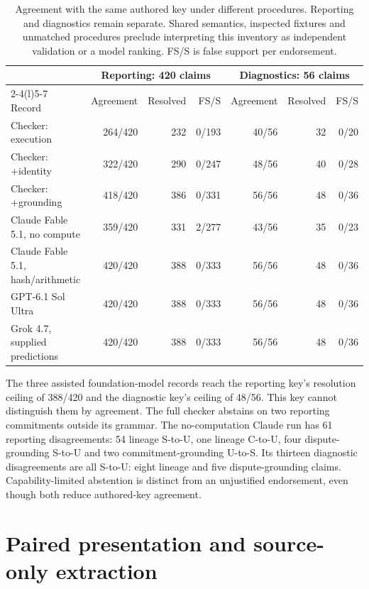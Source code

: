 \begin{table}[t]
\caption{Agreement with the same authored key under different procedures. Reporting and diagnostics remain separate. Shared semantics, inspected fixtures and unmatched procedures preclude interpreting this inventory as independent validation or a model ranking. FS/S is false support per endorsement.}
\label{tab:supp-counts}
\small
\begin{tabularx}{\textwidth}{@{}Xrrrrrr@{}}
\toprule
 & \multicolumn{3}{c}{Reporting: 420 claims} & \multicolumn{3}{c}{Diagnostics: 56 claims}\\
\cmidrule(lr){2-4}\cmidrule(l){5-7}
Record & Agreement & Resolved & FS/S & Agreement & Resolved & FS/S\\
\midrule
Checker: execution & 264/420 & 232 & 0/193 & 40/56 & 32 & 0/20\\
Checker: +identity & 322/420 & 290 & 0/247 & 48/56 & 40 & 0/28\\
Checker: +grounding & 418/420 & 386 & 0/331 & 56/56 & 48 & 0/36\\
Claude Fable 5.1, no compute & 359/420 & 331 & 2/277 & 43/56 & 35 & 0/23\\
Claude Fable 5.1, hash/arithmetic & 420/420 & 388 & 0/333 & 56/56 & 48 & 0/36\\
GPT-6.1 Sol Ultra & 420/420 & 388 & 0/333 & 56/56 & 48 & 0/36\\
Grok 4.7, supplied predictions & 420/420 & 388 & 0/333 & 56/56 & 48 & 0/36\\
\bottomrule
\end{tabularx}
\end{table}

The three assisted foundation-model records reach the reporting key's resolution ceiling of 388/420 and the diagnostic key's ceiling of 48/56. This key cannot distinguish them by agreement. The full checker abstains on two reporting commitments outside its grammar. The no-computation Claude run has 61 reporting disagreements: 54 lineage S-to-U, one lineage C-to-U, four dispute-grounding S-to-U and two commitment-grounding U-to-S. Its thirteen diagnostic disagreements are all S-to-U: eight lineage and five dispute-grounding claims. Capability-limited abstention is distinct from an unjustified endorsement, even though both reduce authored-key agreement.

\section{Paired presentation and source-only extraction}
\label{app:modalities}

